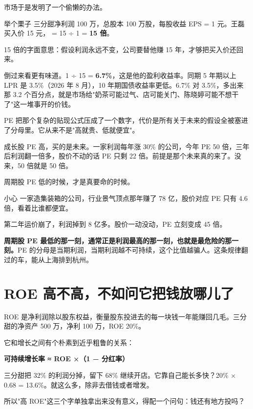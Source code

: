 市场于是发明了一个偷懒的办法。

\begin{egbox}{举个栗子}
三分甜净利润 100 万，总股本 100 万股，每股收益 EPS = 1 元。王磊买入价 15 元， = 15 ÷ 1 = \textbf{15 倍}。

15 倍的字面意思：假设利润永远不变，公司要替他赚 15 年，才够把买入价还回来。

倒过来看更有味道。1 ÷ 15 = \textbf{6.7\%}，这是他的盈利收益率。同期 5 年期以上 LPR 是 3.5\%（2026 年 8 月），10 年期国债收益率更低。6.7\% 对 3.5\%，多出来那 3.2 个百分点，就是市场给"奶茶可能过气、店可能关门、陈晓婷可能不想干了"这一堆事开的价钱。

\end{egbox}

PE 把那个复杂的贴现公式压成了一个数字，代价是所有关于未来的假设全被塞进了分母里。它从来不是"高就贵、低就便宜"。

成长股 PE 高，买的是未来。一家利润每年涨 30\% 的公司，今年 PE 50 倍，三年后利润翻一倍多，股价不动的话 PE 只剩 22 倍。前提是那个未来真的来了。没来，50 倍就是 50 倍。

周期股 PE 低的时候，才是真要命的时候。

\begin{warnbox}{小心}
一家造集装箱的公司，行业景气顶点那年赚了 78 亿，股价对应 PE 只有 4.6 倍，看着比谁都便宜。

第二年运价崩了，利润掉到 8 亿多。股价一动没动，PE 立刻变成 45 倍。

\textbf{周期股 PE 最低的那一刻，通常正是利润最高的那一刻，也就是最危险的那一刻。}PE 的分母是当期利润，当期利润越不可持续，这个比值越骗人。这条规律翻过的车，能从上海排到杭州。

\end{warnbox}

\section{ROE 高不高，不如问它把钱放哪儿了}

ROE 是净利润除以股东权益，衡量股东投进去的每一块钱一年能赚回几毛。三分甜的净资产 500 万，净利 100 万，ROE 20\%。

它和增长之间有个朴素到近乎粗鲁的关系：

\textbf{可持续增长率 ≈ ROE ×（1 − 分红率）}

三分甜把 32\% 的利润分掉，留下 68\% 继续开店。它靠自己能长多快？20\% × 0.68 = 13.6\%。就这么多，除非去借钱或者增发。

所以"高 ROE"这三个字单独拿出来没有意义，得配一个问句：钱还有地方投吗？

